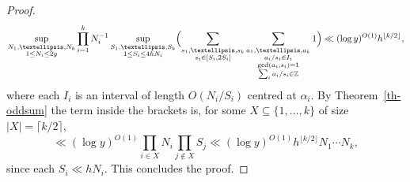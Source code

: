 \documentclass[10pt,a4paper]{amsart}
\newcommand{\abs}[1]{\left\lvert #1\right\rvert}
\newcommand{\ogcd}[2]{\gcd(#1,#2)}
\begin{document}
\begin{proof}
\[ \sup_{\substack{N_1,\ldots,N_k\\ 1\leq N_i\leq 2y}}\prod_{i=1}^kN_i^{-1}\sup_{\substack{S_1,\ldots,S_k\\ 1\leq S_i\leq 4hN_i}} \Bigl(\sum_{\substack{s_1, \dots, s_k \\s_i\in [S_i,2S_i]}}\sum_{\substack{a_1, \dots, a_k \\ a_i/s_i \in I_i \\ \ogcd{a_i}{s_i} = 1 \\ \sum_i a_i/s_i \in \mathbb Z}}1\Bigr)\ll (\log y)^{O(1)}h^{\lfloor k/2\rfloor},\]
where each $I_i$ is an interval of length $O(N_i/S_i)$ centred at $\alpha_i$. By Theorem~\ref{th-oddsum} the term inside the brackets is, for some $X\subseteq \{1,\ldots,k\}$ of size $\abs{X}=\lceil k/2\rceil$, 
\[\ll (\log y)^{O(1)}\prod_{i\in X}N_i\prod_{j\not\in X}S_j\ll (\log y)^{O(1)}h^{\lfloor k/2\rfloor} N_1\cdots N_k,\]
since each $S_i\ll hN_i$. This concludes the proof.
\end{proof}
\end{document}
